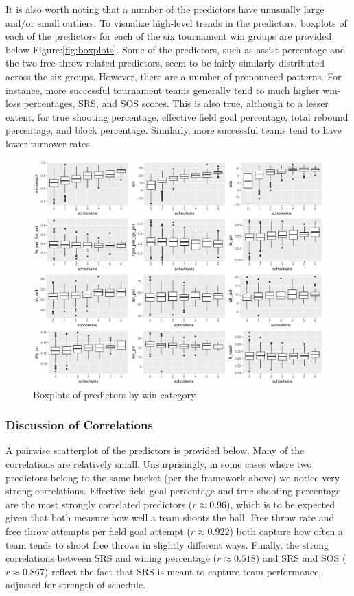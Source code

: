\documentclass[10pt,a4paper, hidelinks]{article} %
\begin{document}
It is also worth noting that a number of the predictors have unusually large and/or small outliers. To visualize high-level trends in the predictors, boxplots of each of the predictors for each of the six tournament win groups are provided below Figure:\eqref{fig:boxplots}. Some of the predictors, such as assist percentage and the two free-throw related predictors, seem to be fairly similarly distributed across the six groups. However, there are a number of pronounced patterns. For instance, more successful tournament teams generally tend to much higher win-loss percentages, SRS, and SOS scores. This is also true, although to a lesser extent, for true shooting percentage, effective field goal percentage, total rebound percentage, and block percentage. Similarly, more successful teams tend to have lower turnover rates. 

\begin{figure}[H]
	\centering
	\includegraphics[height = 7 cm]{../fig/RayleighsWetDream.pdf}
	\caption{Boxplots of predictors by win category}
	\label{fig:boxplots}
\end{figure}

\subsubsection{Discussion of Correlations}

A pairwise scatterplot of the predictors is provided below. Many of the correlations are relatively small. Unsurprisingly, in some cases where two predictors belong to the same bucket (per the framework above) we notice very strong correlations. Effective field goal percentage and true shooting percentage are the most strongly correlated predictors ($r \approx 0.96$), which is to be expected given that both measure how well a team shoots the ball. Free throw rate and free throw attempts per field goal attempt ($r \approx 0.922$) both capture how often a team tends to shoot free throws in slightly different ways. Finally, the strong correlations between SRS and wining percentage ($r \approx 0.518$) and SRS and SOS ($r \approx 0.867$) reflect the fact that SRS is meant to capture team performance, adjusted for strength of schedule.
\end{document}

